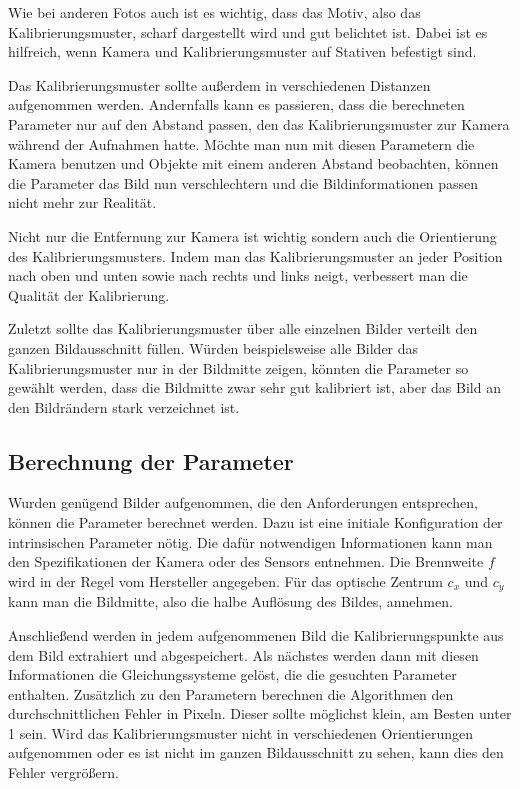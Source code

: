 Wie bei anderen Fotos auch ist es wichtig, dass das Motiv, also das Kalibrierungsmuster, scharf dargestellt wird und gut belichtet ist. Dabei ist es hilfreich, wenn Kamera und Kalibrierungsmuster auf Stativen befestigt sind. 

Das Kalibrierungsmuster sollte außerdem in verschiedenen Distanzen aufgenommen werden. Andernfalls kann es passieren, dass die berechneten Parameter nur auf den Abstand passen, den das Kalibrierungsmuster zur Kamera während der Aufnahmen hatte. Möchte man nun mit diesen Parametern die Kamera benutzen und Objekte mit einem anderen Abstand beobachten, können die Parameter das Bild nun verschlechtern und die Bildinformationen passen nicht mehr zur Realität.

Nicht nur die Entfernung zur Kamera ist wichtig sondern auch die Orientierung des Kalibrierungsmusters. Indem man das Kalibrierungsmuster an jeder Position nach oben und unten sowie nach rechts und links neigt, verbessert man die Qualität der Kalibrierung.

Zuletzt sollte das Kalibrierungsmuster über alle einzelnen Bilder verteilt den ganzen Bildausschnitt füllen. Würden beispielsweise alle Bilder das Kalibrierungsmuster nur in der Bildmitte zeigen, könnten die Parameter so gewählt werden, dass die Bildmitte zwar sehr gut kalibriert ist, aber das Bild an den Bildrändern stark verzeichnet ist. 

\subsection{Berechnung der Parameter} %
\label{sub:berechnung_der_parameter}
Wurden genügend Bilder aufgenommen, die den Anforderungen entsprechen, können die Parameter berechnet werden. Dazu ist eine initiale Konfiguration der intrinsischen Parameter nötig. Die dafür notwendigen Informationen kann man den Spezifikationen der Kamera oder des Sensors entnehmen. Die Brennweite $f$ wird in der Regel vom Hersteller angegeben. Für das optische Zentrum $c_x$ und $c_y$ kann man die Bildmitte, also die halbe Auflösung des Bildes, annehmen.

Anschließend werden in jedem aufgenommenen Bild die Kalibrierungspunkte aus dem Bild extrahiert und abgespeichert. Als nächstes werden dann mit diesen Informationen die Gleichungssysteme gelöst, die die gesuchten Parameter enthalten. Zusätzlich zu den Parametern berechnen die Algorithmen den durchschnittlichen Fehler in Pixeln. Dieser sollte möglichst klein, am Besten unter 1 sein. Wird das Kalibrierungsmuster nicht in verschiedenen Orientierungen aufgenommen oder es ist nicht im ganzen Bildausschnitt zu sehen, kann dies den Fehler vergrößern.

